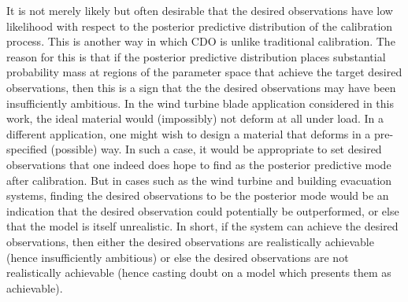 \documentclass{article}
\begin{document}
It is not merely likely but often desirable that the desired observations have low likelihood with respect to the posterior predictive distribution of the calibration process. This is another way in which CDO is unlike traditional calibration. The reason for this is that if the posterior predictive distribution places substantial probability mass at regions of the parameter space that achieve the target desired observations, then this is a sign that the the desired observations may have been insufficiently ambitious. 
In the wind turbine blade application considered in this work, the ideal material would (impossibly) not deform at all under load.
In a different application, one might wish to design a material that deforms in a pre-specified (possible) way. 
In such a case, it would be appropriate to set desired observations that one indeed does hope to find as the posterior predictive mode after calibration. 
But in cases such as the wind turbine and building evacuation systems, finding the desired observations to be the posterior mode would be an indication that the desired observation could potentially be outperformed, or else that the model is itself unrealistic. In short, if the system can achieve the desired observations, then either the desired observations are realistically achievable (hence insufficiently ambitious) or else the desired observations are not realistically achievable (hence casting doubt on a model which presents them as achievable).
\end{document}
